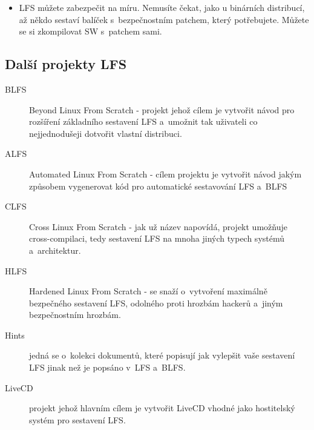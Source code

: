 \documentclass[a4paper,12pt]{article}
\begin{document}
\begin{itemize}

\item LFS můžete zabezpečit na míru. Nemusíte čekat, jako u binárních distribucí, až někdo sestaví balíček s~bezpečnostním patchem, který potřebujete. Můžete se si zkompilovat SW s~patchem sami.

\end{itemize}

\subsection{Další projekty LFS}
\begin{description}
 \item[BLFS] Beyond Linux From Scratch - projekt jehož cílem je vytvořit návod pro rozšíření základního sestavení LFS a~umožnit tak uživateli co nejjednodušeji dotvořit vlastní distribuci.
 \item[ALFS] Automated Linux From Scratch - cílem projektu je vytvořit návod jakým způsobem vygenerovat kód pro automatické sestavování LFS a~BLFS
 \item[CLFS] Cross Linux From Scratch - jak už název napovídá, projekt umožňuje cross-compilaci, tedy sestavení LFS na mnoha jiných typech systémů a~architektur.
 \item[HLFS] Hardened Linux From Scratch - se snaží o~vytvoření maximálně bezpečného sestavení LFS, odolného proti hrozbám hackerů a~jiným bezpečnostním hrozbám.
 \item[Hints] jedná se o~kolekci dokumentů, které popisují jak vylepšit vaše sestavení LFS jinak než je popsáno v~LFS a~BLFS.
 \item[LiveCD] projekt jehož hlavním cílem je vytvořit LiveCD vhodné jako hostitelský systém pro sestavení LFS.
 \end{description}
\end{document}
